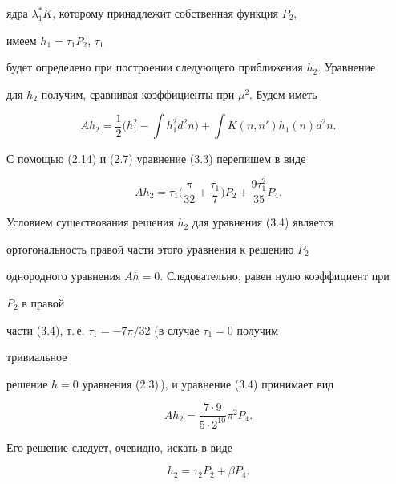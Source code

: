 ядра $\lambda^*_1K$, которому принадлежит собственная функция $P_2$,


имеем $h_1=\tau_1P_2$, $\tau_1$


будет определено при построении следующего приближения $h_2$. Уравнение


для $h_2$ получим, сравнивая коэффициенты при $\mu^2$. Будем иметь


\begin{equation}


Ah_2=\frac{1}{2}\biggl(h^2_1-\int h^2_1d^2n \biggr)+


\int K(n,n')h_1(n)d^2n.


\tag{3.3}


\end{equation}


С помощью (2.14) и (2.7) уравнение (3.3) перепишем в виде


\begin{equation}


Ah_2=\tau_1\biggl(\frac{\pi}{32}+\frac{\tau_1}{7} \biggr)P_2+


\frac{9\tau^2_1}{35}P_4.


\tag{3.4}


\end{equation}


Условием существования решения $h_2$ для уравнения (3.4) является


ортогональность правой части этого уравнения к решению $P_2$


однородного уравнения $Ah=0$. Следовательно, равен нулю коэффициент при


$P_2$ в правой


части (3.4), т.\,е. $\tau_1=-7\pi/32$ (в случае $\tau_1=0$ получим


тривиальное


решение $h=0$ уравнения (2.3)\,), и уравнение (3.4) принимает вид


\begin{equation}


Ah_2=\frac{7\cdot 9}{5\cdot 2^{10}}\pi^2P_4.


\tag{3.5}


\end{equation}


Его решение следует, очевидно, искать в виде


\begin{equation}


h_2=\tau_2P_2+\beta P_4.


\tag{3.6}


\end{equation}


